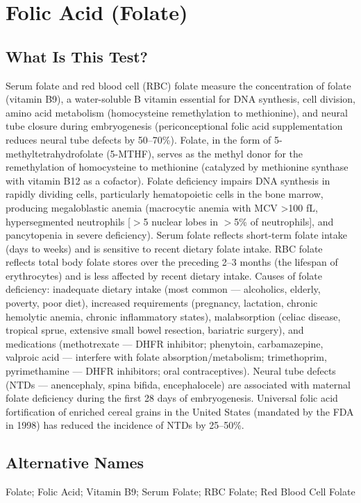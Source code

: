 \chapter{Folic Acid (Folate)}
\section*{What Is This Test?}
Serum folate and red blood cell (RBC) folate measure the concentration of folate (vitamin B9), a water-soluble B vitamin essential for DNA synthesis, cell division, amino acid metabolism (homocysteine remethylation to methionine), and neural tube closure during embryogenesis (periconceptional folic acid supplementation reduces neural tube defects by 50--70\%). Folate, in the form of 5-methyltetrahydrofolate (5-MTHF), serves as the methyl donor for the remethylation of homocysteine to methionine (catalyzed by methionine synthase with vitamin B12 as a cofactor). Folate deficiency impairs DNA synthesis in rapidly dividing cells, particularly hematopoietic cells in the bone marrow, producing megaloblastic anemia (macrocytic anemia with MCV >100 fL, hypersegmented neutrophils [$>$5 nuclear lobes in $>$5\% of neutrophils], and pancytopenia in severe deficiency). Serum folate reflects short-term folate intake (days to weeks) and is sensitive to recent dietary folate intake. RBC folate reflects total body folate stores over the preceding 2--3 months (the lifespan of erythrocytes) and is less affected by recent dietary intake. Causes of folate deficiency: inadequate dietary intake (most common --- alcoholics, elderly, poverty, poor diet), increased requirements (pregnancy, lactation, chronic hemolytic anemia, chronic inflammatory states), malabsorption (celiac disease, tropical sprue, extensive small bowel resection, bariatric surgery), and medications (methotrexate --- DHFR inhibitor; phenytoin, carbamazepine, valproic acid --- interfere with folate absorption/metabolism; trimethoprim, pyrimethamine --- DHFR inhibitors; oral contraceptives). Neural tube defects (NTDs --- anencephaly, spina bifida, encephalocele) are associated with maternal folate deficiency during the first 28 days of embryogenesis. Universal folic acid fortification of enriched cereal grains in the United States (mandated by the FDA in 1998) has reduced the incidence of NTDs by 25--50\%.
\section*{Alternative Names}
Folate; Folic Acid; Vitamin B9; Serum Folate; RBC Folate; Red Blood Cell Folate
